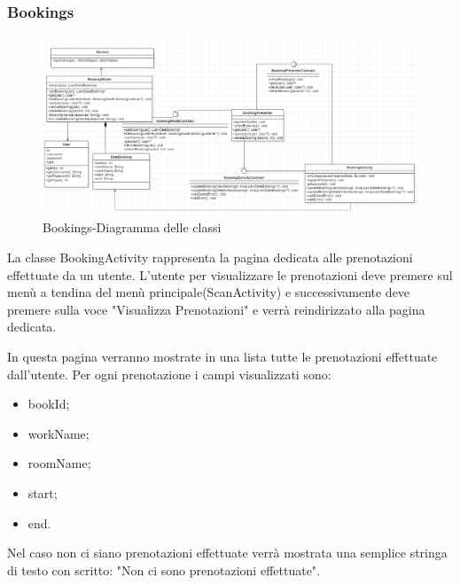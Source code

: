 \subsubsection{Bookings}
\begin{figure}[H]
	\centering
	\includegraphics[width=16cm]{res/images/BookingsClass.png}
	\caption{Bookings-Diagramma delle classi}
	\label{fig:Bookings-Diagramma delle classi}
\end{figure}
La classe BookingActivity rappresenta la pagina dedicata alle prenotazioni effettuate da un utente. L'utente per visualizzare le prenotazioni deve premere sul menù a tendina del menù principale(ScanActivity) e successivamente deve premere sulla voce "Visualizza Prenotazioni" e verrà reindirizzato alla pagina dedicata.

In questa pagina verranno mostrate in una lista tutte le prenotazioni effettuate dall'utente. Per ogni prenotazione i campi visualizzati sono: 
\begin{itemize}
	\item bookId; 
	\item workName; 
	\item roomName; 
	\item start; 
	\item end. 
\end{itemize}
Nel caso non ci siano prenotazioni effettuate verrà mostrata una semplice stringa di testo con scritto: "Non ci sono prenotazioni effettuate".

